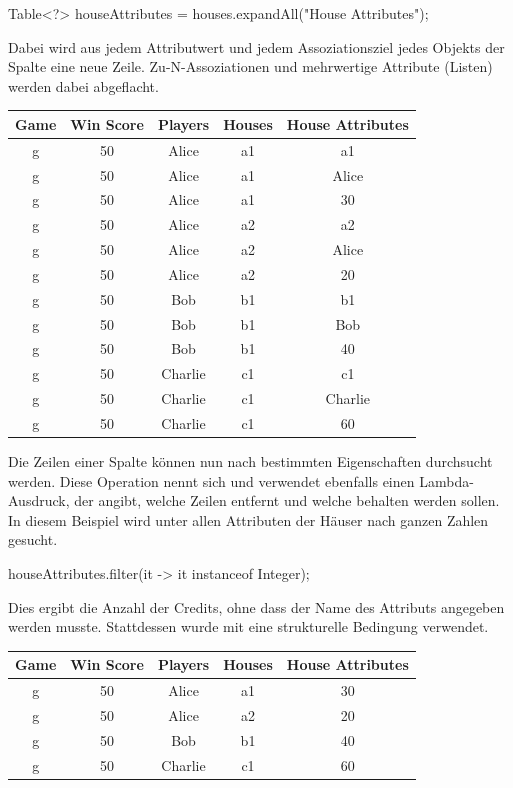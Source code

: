 \begin{jcodeblock}
    Table<?> houseAttributes = houses.expandAll("House Attributes");
\end{jcodeblock}

Dabei wird aus jedem Attributwert und jedem Assoziationsziel jedes Objekts der Spalte  eine neue Zeile.
Zu-N-Assoziationen und mehrwertige Attribute (Listen) werden dabei abgeflacht.

\begin{tabular}{|c|c|c|c|c|}
    \hline
    \textbf{Game} & \textbf{Win Score} & \textbf{Players} & \textbf{Houses} & \textbf{House Attributes} \\
    \hline
    g & 50 & Alice   & a1 & a1      \\
    g & 50 & Alice   & a1 & Alice   \\
    g & 50 & Alice   & a1 & 30      \\
    g & 50 & Alice   & a2 & a2      \\
    g & 50 & Alice   & a2 & Alice   \\
    g & 50 & Alice   & a2 & 20      \\
    g & 50 & Bob     & b1 & b1      \\
    g & 50 & Bob     & b1 & Bob     \\
    g & 50 & Bob     & b1 & 40      \\
    g & 50 & Charlie & c1 & c1      \\
    g & 50 & Charlie & c1 & Charlie \\
    g & 50 & Charlie & c1 & 60      \\
    \hline
\end{tabular}

Die Zeilen einer Spalte können nun nach bestimmten Eigenschaften durchsucht werden.
Diese Operation nennt sich  und verwendet ebenfalls einen Lambda-Ausdruck,
der angibt, welche Zeilen entfernt und welche behalten werden sollen.
In diesem Beispiel wird unter allen Attributen der Häuser nach ganzen Zahlen gesucht.

\begin{jcodeblock}
    houseAttributes.filter(it -> it instanceof Integer);
\end{jcodeblock}

Dies ergibt die Anzahl der Credits, ohne dass der Name des Attributs angegeben werden musste.
Stattdessen wurde mit  eine strukturelle Bedingung verwendet.

\begin{tabular}{|c|c|c|c|c|}
    \hline
    \textbf{Game} & \textbf{Win Score} & \textbf{Players} & \textbf{Houses} & \textbf{House Attributes} \\
    \hline
    g & 50 & Alice   & a1 & 30      \\
    g & 50 & Alice   & a2 & 20      \\
    g & 50 & Bob     & b1 & 40      \\
    g & 50 & Charlie & c1 & 60      \\
    \hline
\end{tabular}

